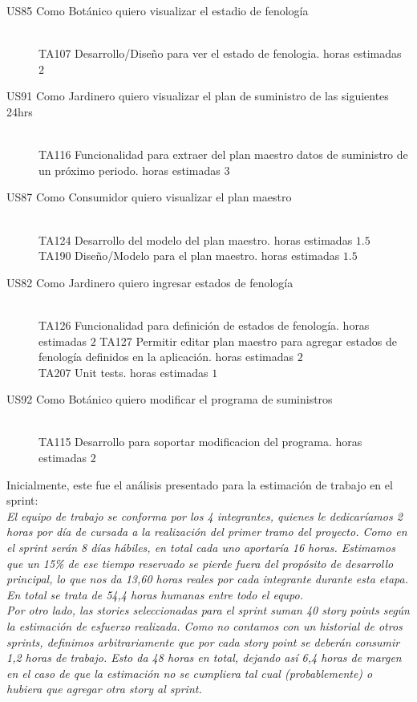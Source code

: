 \begin{description}
    \item[US85 Como Botánico quiero visualizar el estadio de fenología] \hfill \\
    TA107	Desarrollo/Diseño para ver el estado de fenologia. horas estimadas $2$
    \item[US91	Como Jardinero quiero visualizar el plan de suministro de las siguientes 24hrs] \hfill \\
    	TA116	Funcionalidad para extraer del plan maestro datos de suministro de un próximo periodo. horas estimadas $3$
    
    \item[US87	Como Consumidor quiero visualizar el plan maestro] \hfill \\
    TA124	Desarrollo del modelo del plan maestro. horas estimadas $1.5$ \\
    TA190	Diseño/Modelo para el plan maestro. horas estimadas $1.5$ \\
    
        \item[US82	Como Jardinero quiero ingresar estados de fenología] \hfill \\
        TA126	Funcionalidad para definición de estados de fenología. horas estimadas $2$
        TA127	Permitir editar plan maestro para agregar estados de fenología definidos en la aplicación. horas estimadas $2$ \\
        TA207	Unit tests. horas estimadas $1$
        
         \item[US92	Como Botánico quiero modificar el programa de suministros] \hfill \\
         TA115	Desarrollo para soportar modificacion del programa. horas estimadas $2$
         
        

\end{description}

Inicialmente, este fue el análisis presentado para la estimación de trabajo en el sprint:\\

\indent \textsl{El equipo de trabajo se conforma por los 4 integrantes, quienes le dedicaríamos 2 horas por día de cursada a la realización del primer tramo del proyecto. Como en el sprint serán 8 días hábiles, en total cada uno aportaría 16 horas. Estimamos que un 15\% de ese tiempo reservado se pierde fuera del propósito de desarrollo principal, lo que nos da 13,60 horas reales por cada integrante durante esta etapa. En total se trata de 54,4 horas humanas entre todo el equpo.}\\
\indent \textsl{Por otro lado, las stories seleccionadas para el sprint suman 40 story points según la estimación de esfuerzo realizada. Como no contamos con un historial de otros sprints, definimos arbitrariamente que por cada story point se deberán consumir 1,2 horas de trabajo. Esto da 48 horas en total, dejando así 6,4 horas de margen en el caso de que la estimación no se cumpliera tal cual (probablemente) o hubiera que agregar otra story al sprint.}\\

